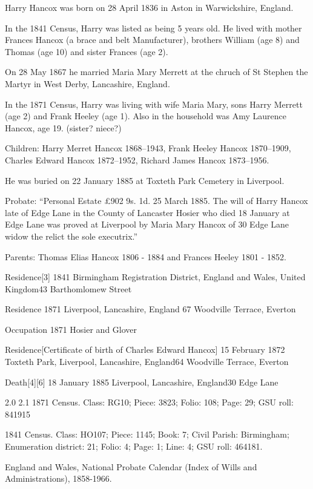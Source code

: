 
Harry Hancox was born on 28 April 1836 in Aston in Warwickshire, England.

In the 1841 Census, Harry was listed as being 5 years old. He lived with mother Frances Hancox (a brace and belt Manufacturer), brothers William (age 8) and Thomas (age 10) and sister Frances (age 2).

On 28 May 1867 he married Maria Mary Merrett at the chruch of St Stephen the Martyr in West Derby, Lancashire, England.

In the 1871 Census, Harry was living with wife Maria Mary, sons Harry Merrett (age 2) and Frank Heeley (age 1). Also in the household was Amy Laurence Hancox, age 19. (sister? niece?)

Children:
Harry Merret Hancox 1868--1943,
Frank Heeley Hancox 1870--1909,
Charles Edward Hancox 1872--1952,
Richard James Hancox 1873--1956.

He was buried on 22 January 1885 at Toxteth Park Cemetery in Liverpool.\cite{HHGravestone}

Probate: ``Personal Estate \pounds 902 9s. 1d. 25 March 1885. The will of Harry Hancox late of Edge Lane in the County of Lancaster Hosier who died 18 January at Edge Lane was proved at Liverpool by Maria Mary Hancox of 30 Edge Lane widow the relict the sole executrix.''



Parents: Thomas Elias Hancox 1806 - 1884 and Frances Heeley 1801 - 1852.

Residence[3] 	1841 	Birmingham Registration District, England and Wales, United Kingdom43 Barthomlomew Street

Residence\cite{Census1871-3823} 	1871 	Liverpool, Lancashire, England 67 Woodville Terrace, Everton

Occupation\cite{Census1871-3823} 	1871 	Hosier and Glover

Residence\cite{CEHbirthCert}[Certificate of birth of Charles Edward Hancox] 	15 February 1872 	Toxteth Park, Liverpool, Lancashire, England64 Woodville Terrace, Everton

Death[4][6] 	18 January 1885 	Liverpool, Lancashire, England30 Edge Lane


2.0 2.1 1871 Census. Class: RG10; Piece: 3823; Folio: 108; Page: 29; GSU roll: 841915

1841 Census. Class: HO107; Piece: 1145; Book: 7; Civil Parish: Birmingham; Enumeration district: 21; Folio: 4; Page: 1; Line: 4; GSU roll: 464181.

England and Wales, National Probate Calendar (Index of Wills and Administrations), 1858-1966.

